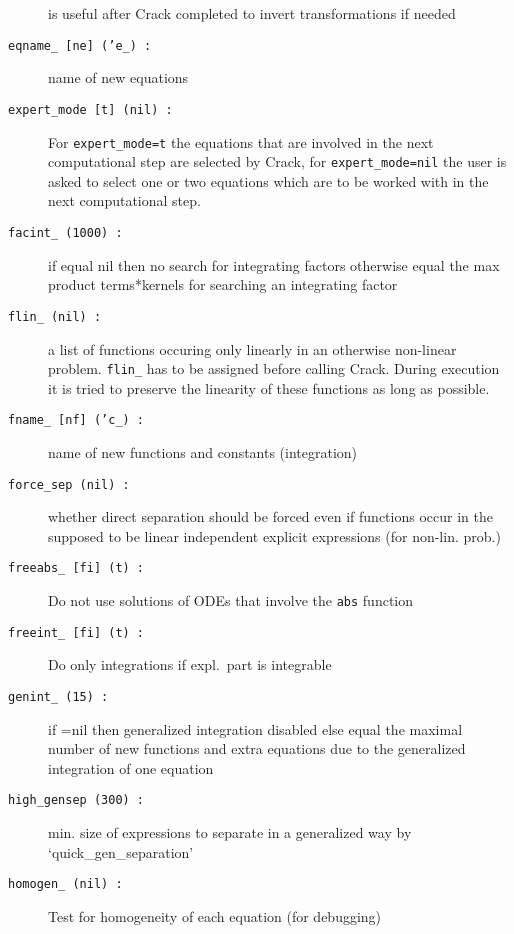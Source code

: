 \documentclass[12pt]{article}
\begin{document}
\begin{description}
                   is useful after {\sc Crack} completed to invert
                   transformations if needed
\item[{\tt eqname\_ [ne] ('e\_) :}] name of new equations
\item[{\tt expert\_mode [t] (nil) :}] For {\tt expert\_mode=t} the
                   equations that are involved in the next computational step are
                   selected by {\sc Crack}, for {\tt expert\_mode=nil} the user
                   is asked to select one or two equations which are to be worked
                   with in the next computational step.
\item[{\tt facint\_ (1000) :}] if equal nil then no search for
                    integrating factors otherwise equal the  max
                    product terms*kernels for searching an integrating
                    factor
\item[{\tt flin\_ (nil) :}] a list of functions occuring only linearly in an
                   otherwise non-linear problem. {\tt flin\_} has to be assigned
                   before calling {\sc Crack}. During execution it is tried to
                   preserve the linearity of these functions as long as possible.
\item[{\tt fname\_ [nf] ('c\_) :}] name of new functions and constants
                                   (integration)
\item[{\tt force\_sep (nil) :}] whether direct separation should be forced even
                   if functions occur in the supposed to be linear
                   independent explicit expressions (for non-lin. prob.)
\item[{\tt freeabs\_ [fi] (t) :}] Do not use solutions of ODEs that
                    involve the {\tt abs} function
\item[{\tt freeint\_ [fi] (t) :}] Do only integrations if expl.\ part
                    is integrable
\item[{\tt genint\_ (15) :}]  if =nil then generalized integration disabled
                    else equal the maximal number of new functions and extra
                    equations due to the generalized integration of
                    one equation
\item[{\tt high\_gensep (300) :}] min. size of expressions to separate in a
                    generalized way by \\ `quick\_gen\_separation'
\item[{\tt homogen\_ (nil) :}] Test for homogeneity of each equation
                    (for debugging)

\end{description}
\end{document}
